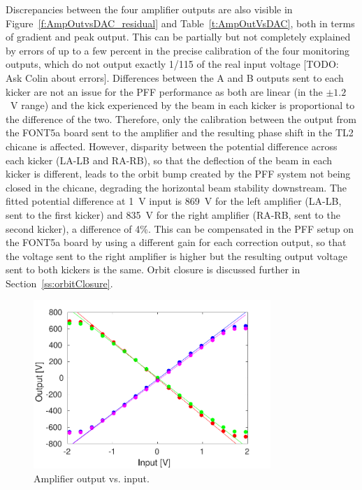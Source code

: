 Discrepancies between the four amplifier outputs are also visible in Figure~\ref{f:AmpOutvsDAC_residual} and Table~\ref{t:AmpOutVsDAC}, both in terms of gradient and peak output. This can be partially but not completely explained by errors of up to a few percent in the precise calibration of the four monitoring outputs, which do not output exactly 1/115 of the real input voltage [TODO: Ask Colin about errors]. Differences between the A and B outputs sent to each kicker are not an issue for the PFF performance as both are linear (in the \(\pm1.2\)~V range) and the kick experienced by the beam in each kicker is proportional to the difference of the two. Therefore, only the calibration between the output from the FONT5a board sent to the amplifier and the resulting phase shift in the TL2 chicane is affected. However, disparity between the potential difference across each kicker (LA-LB and RA-RB), so that the deflection of the beam in each kicker is different, leads to the orbit bump created by the PFF system not being closed in the chicane, degrading the horizontal beam stability downstream. The fitted potential difference at 1~V input is 869~V for the left amplifier (LA-LB, sent to the first kicker) and 835~V for the right amplifier (RA-RB, sent to the second kicker), a difference of 4\%. This can be compensated in the PFF setup on the FONT5a board by using a different gain for each correction output, so that the voltage sent to the right amplifier is higher but the resulting output voltage sent to both kickers is the same. Orbit closure is discussed further in Section~\ref{ss:orbitClosure}.


\begin{figure}
  \centering
  \includegraphics[width=0.8\textwidth]{Figures/commissioning/AmpOutvsDAC}
  \caption{Amplifier output vs. input.}
  \label{f:AmpOutvsDAC}
\end{figure}

